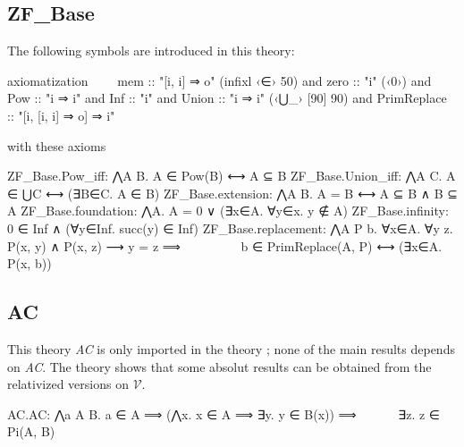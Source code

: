 \subsection{ZF\_Base}
The following symbols are introduced in this theory:
\begin{isabelle}
axiomatization\isanewline
\ \ \ \      mem :: "[i, i] ⇒ o"  (infixl ‹∈› 50)  \isanewline
  and zero :: "i"  (‹0›)  \isanewline
  and Pow :: "i ⇒ i"  \isanewline
  and Inf :: "i"  \isanewline
  and Union :: "i ⇒ i"  (‹⋃\_› [90] 90)\isanewline
  and PrimReplace :: "[i, [i, i] ⇒ o] ⇒ i"
\end{isabelle}
\noindent with these axioms
\begin{isabelle}
ZF\_Base.Pow\_iff: ⋀A B. A ∈ Pow(B) ⟷ A ⊆ B\isanewline
ZF\_Base.Union\_iff: ⋀A C. A ∈ ⋃C ⟷ (∃B∈C. A ∈ B)\isanewline
ZF\_Base.extension: ⋀A B. A = B ⟷ A ⊆ B ∧ B ⊆ A\isanewline
ZF\_Base.foundation: ⋀A. A = 0 ∨ (∃x∈A. ∀y∈x. y ∉ A)\isanewline
ZF\_Base.infinity: 0 ∈ Inf ∧ (∀y∈Inf. succ(y) ∈ Inf)\isanewline
ZF\_Base.replacement: ⋀A P b. ∀x∈A. ∀y z. P(x, y) ∧ P(x, z) ⟶ y = z ⟹ \isanewline
\ \ \ \ \ \ \ \ \ b ∈ PrimReplace(A, P) ⟷ (∃x∈A. P(x, b))
\end{isabelle}

\subsection{AC}

This theory \textit{AC} is only imported in the theory
; none of the main results
depends on \textit{AC}. The theory 
shows that some absolut results can be obtained from the
relativized versions on $\mathcal{V}$.

\begin{isabelle}
AC.AC: ⋀a A B. a ∈ A ⟹ (⋀x. x ∈ A ⟹ ∃y. y ∈ B(x)) ⟹\isanewline
  \ \ \ \ \ \ ∃z. z ∈ Pi(A, B)
\end{isabelle}


